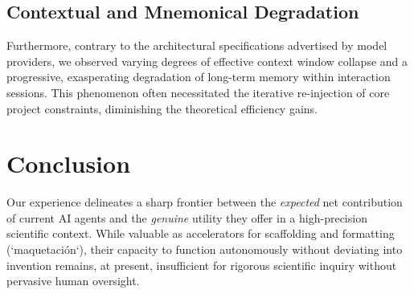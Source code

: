 \documentclass[11pt]{article}
\begin{document}
\subsection*{Contextual and Mnemonical Degradation}
Furthermore, contrary to the architectural specifications advertised by model providers, we observed varying degrees of effective context window collapse and a progressive, exasperating degradation of long-term memory within interaction sessions. This phenomenon often necessitated the iterative re-injection of core project constraints, diminishing the theoretical efficiency gains.

\section*{Conclusion}
Our experience delineates a sharp frontier between the \textit{expected} net contribution of current AI agents and the \textit{genuine} utility they offer in a high-precision scientific context. While valuable as accelerators for scaffolding and formatting (`maquetación`), their capacity to function autonomously without deviating into invention remains, at present, insufficient for rigorous scientific inquiry without pervasive human oversight.
\end{document}

